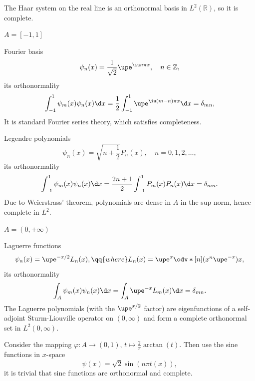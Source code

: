 \begin{solution}
\begin{enumext}
\begin{enumext}
\begin{enumext}[wrap-label = \underline{Case #1}, label = \arabic*,
                      list-indent = 0pt]
\[        \]
        The Haar system on the real line is an orthonormal basis in $L^2(\mathbb R)$, so it is complete.
      \end{enumext}
      \item $A = [-1, 1]$
      \begin{enumext}[wrap-label = \underline{Case #1}, label = \arabic*,
                    list-indent = 0pt]
        \item Fourier basis
        \[
          \psi_n(x) = \frac1{\sqrt2} \upe^{\iu n\pi x}, \quad n \in \mathbb Z,
        \]
        its orthonormality
        \[
          \int_{-1}^1 \psi_m(x) \psi_n(x) \d x
        = \frac12 \int_{-1}^1 \upe^{\iu(m-n)\pi x} \d x = \delta_{mn},
        \]
        It is standard Fourier series theory, which satisfies completeness.
        \item Legendre polynomials
        \[
          \psi_n(x) = \sqrt{n + \frac12} P_n(x), \quad n = 0, 1, 2, \ldots,
        \]
        its orthonormality
        \[
          \int_{-1}^1 \psi_m(x) \psi_n(x) \d x
        = \frac{2n + 1}{2} \int_{-1}^1 P_m(x) P_n(x) \d x = \delta_{mn}.
        \]
        Due to Weierstrass' theorem, polynomials are dense in $A$ in the sup norm, hence complete in $L^2$.
      \end{enumext}
      \item $A = (0, +\infty)$
      \begin{enumext}[wrap-label = \underline{Case #1}, label = \arabic*,
                      list-indent = 0pt]
        \item Laguerre functions
        \[
          \psi_n(x) = \upe^{-x/2} L_n(x), \qq{where}
          L_n(x) = \upe^x \odv*[n]{(x^n \upe^{-x})}x,
        \]
        its orthonormality
        \[
          \int_A \psi_m(x) \psi_n(x) \d x = \int_A \upe^{-x} L_m(x) \d x
        = \delta_{mn}.
        \]
        The Laguerre polynomials (with the $\upe^{x/2}$ factor) are eigenfunctions of a self-adjoint Sturm-Liouville operator on
        $(0, \infty)$ and form a complete orthonormal set in $L^2(0, \infty)$.
        \item Consider the mapping
        $\varphi: A \to (0,1)$, $t \mapsto \frac2\pi\arctan(t)$.
        Then use the sine functions in $x$-space
        \[
          \psi(x) = \sqrt2\sin(n\pi t(x)),
        \]
        it is trivial that sine functions are orthonormal and complete.
      \end{enumext}
    \end{enumext}
  \end{enumext}
\end{solution}


